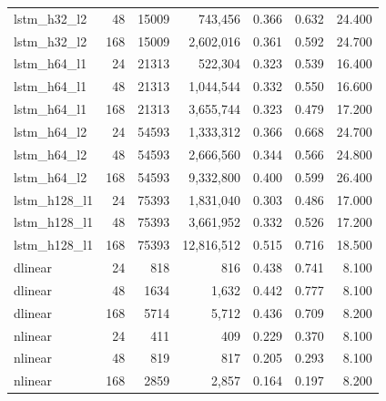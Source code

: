 \begin{table}[htbp]
\begin{tabular}{lrrrrrr}
lstm\_h32\_l2 & 48 & 15009 & 743,456 & 0.366 & 0.632 & 24.400 \\
lstm\_h32\_l2 & 168 & 15009 & 2,602,016 & 0.361 & 0.592 & 24.700 \\
lstm\_h64\_l1 & 24 & 21313 & 522,304 & 0.323 & 0.539 & 16.400 \\
lstm\_h64\_l1 & 48 & 21313 & 1,044,544 & 0.332 & 0.550 & 16.600 \\
lstm\_h64\_l1 & 168 & 21313 & 3,655,744 & 0.323 & 0.479 & 17.200 \\
lstm\_h64\_l2 & 24 & 54593 & 1,333,312 & 0.366 & 0.668 & 24.700 \\
lstm\_h64\_l2 & 48 & 54593 & 2,666,560 & 0.344 & 0.566 & 24.800 \\
lstm\_h64\_l2 & 168 & 54593 & 9,332,800 & 0.400 & 0.599 & 26.400 \\
lstm\_h128\_l1 & 24 & 75393 & 1,831,040 & 0.303 & 0.486 & 17.000 \\
lstm\_h128\_l1 & 48 & 75393 & 3,661,952 & 0.332 & 0.526 & 17.200 \\
lstm\_h128\_l1 & 168 & 75393 & 12,816,512 & 0.515 & 0.716 & 18.500 \\
dlinear & 24 & 818 & 816 & 0.438 & 0.741 & 8.100 \\
dlinear & 48 & 1634 & 1,632 & 0.442 & 0.777 & 8.100 \\
dlinear & 168 & 5714 & 5,712 & 0.436 & 0.709 & 8.200 \\
nlinear & 24 & 411 & 409 & 0.229 & 0.370 & 8.100 \\
nlinear & 48 & 819 & 817 & 0.205 & 0.293 & 8.100 \\
nlinear & 168 & 2859 & 2,857 & 0.164 & 0.197 & 8.200 \\
\bottomrule
\end{tabular}
\end{table}
